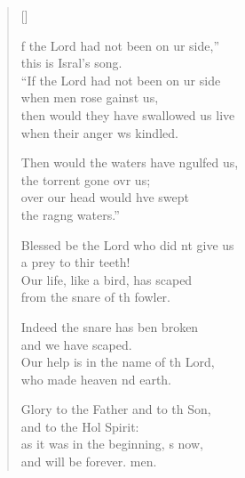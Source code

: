\settowidth{\versewidth}{then would they have swallowed us alive *}
\begin{verse}[\versewidth]
  \begin{patverse}
f the Lord had not been on ur side,”\Med\\
this is Isral’s song.\\
“If the Lord had not been on ur side\Med\\
when men rose gainst us,\\
then would they have swallowed us live\Med\\
when their anger ws kindled.

Then would the waters have ngulfed us,\Med\\
the torrent gone ovr us;\\
over our head would hve swept\Med\\
the rag\pointup{\i}ng waters.”

Blessed be the Lord who did nt give us\Med\\
a prey to thir teeth!\\
Our life, like a bird, has scaped\Med\\
from the snare of th fowler.

Indeed the snare has ben broken\Med\\
and we have scaped.\\
Our help is in the name of th Lord,\Med\\
who made heaven nd earth.

Glory to the Father and to th Son,\Med\\
and to the Hol Spirit:\\
as it was in the beginning, \pointup{\i}s now,\Med\\
and will be forever. men. 
  \end{patverse}
\end{verse}
